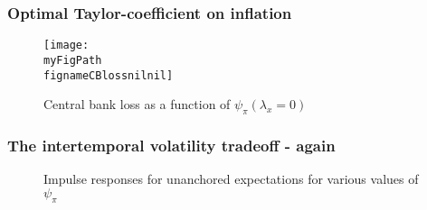 \documentclass[10pt]{beamer}
\def \myFigPath {../../../figures/}
\def\fignameCBlossnilnil{plot_sim_loss_approx_pretty_losses_again_critsmooth_constant_only_pi_only_lamx0_lami0_2020_08_27}
\def\fignameIRFpsipiSmall{command_IFS_anchoring_pretty_RIR_LH_unanch_monpol_again_critCUSUM_constant_only_T_400_N_1000_burnin_5_params_psi_pi_1_01_psi_x_0_gbar_0_145_thetbar_16_thettilde_2_5_kap_0_8_lamx_0_lami_0_date_2020_06_05}
\def\fignameIRFpsipiMedium{command_IFS_anchoring_pretty_RIR_LH_unanch_monpol_again_critCUSUM_constant_only_T_400_N_1000_burnin_5_params_psi_pi_1_5_psi_x_0_gbar_0_145_thetbar_16_thettilde_2_5_kap_0_8_lamx_0_lami_0_date_2020_06_05}
\def\fignameIRFpsipiBig{command_IFS_anchoring_pretty_RIR_LH_unanch_monpol_again_critCUSUM_constant_only_T_400_N_1000_burnin_5_params_psi_pi_2_psi_x_0_gbar_0_145_thetbar_16_thettilde_2_5_kap_0_8_lamx_0_lami_0_date_2020_06_05}
\begin{document}
\begin{frame}
	\frametitle{Optimal Taylor-coefficient on inflation}
	
\begin{figure}[h!]
\caption{Central bank loss as a function of $\psi_{\pi} (\lambda_x = 0)$}
\texttt{[image: \\myFigPath \\fignameCBlossnilnil]}
\end{figure} 

\end{frame}

\begin{frame}
	\frametitle{The intertemporal volatility tradeoff - again}

\begin{figure}[h!]
\caption{Impulse responses for unanchored expectations for various values of $\psi_{\pi}$}
\label{IRF_unanchored_psi}
\end{figure}

\end{frame}
\end{document}
